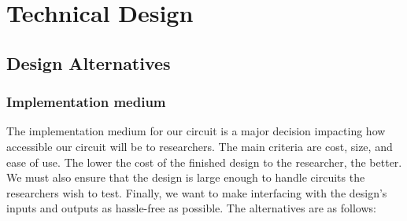 \section{Technical Design}

\subsection{Design Alternatives}

% 
% 
% 

\subsubsection{Implementation medium}

The implementation medium for our circuit is a major decision impacting how accessible our circuit will be to researchers.
The main criteria are cost, size, and ease of use.
The lower the cost of the finished design to the researcher, the better.
We must also ensure that the design is large enough to handle circuits the researchers wish to test.
Finally, we want to make interfacing with the design's inputs and outputs as hassle-free as possible.
The alternatives are as follows:

